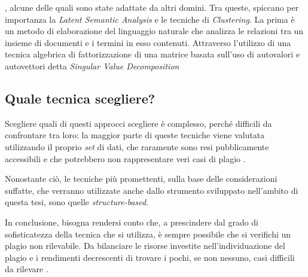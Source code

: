 , alcune delle quali sono state adattate da altri domini.
%
Tra queste, spiccano per importanza la \textit{Latent Semantic Analysis} e le tecniche di \textit{Clustering}.
%
La prima è un metodo di elaborazione del linguaggio naturale che analizza le relazioni tra un insieme di documenti e i termini in esso contenuti.
%
Attraverso l'utilizzo di una tecnica algebrica di fattorizzazione di una matrice basata sull'uso di autovalori e autovettori detta \textit{Singular Value Decomposition} 

\subsection{Quale tecnica scegliere?}
Scegliere quali di questi approcci scegliere è complesso, perché difficili da confrontare tra loro: la maggior parte di queste tecniche viene valutata utilizzando il proprio \textit{set} di dati, che raramente sono resi pubblicamente accessibili e che potrebbero non rappresentare veri casi di plagio \cite{karnalim-budi-toba-joy-2019}.

Nonostante ciò, le tecniche più promettenti, sulla base delle considerazioni suffatte, che verranno utilizzate anche dallo strumento sviluppato nell'ambito di questa tesi, sono quelle \textit{structure-based}. 

In conclusione, bisogna rendersi conto che, a prescindere dal grado di sofisticatezza della tecnica che si utilizza, è sempre possibile che si verifichi un plagio non rilevabile.
%
Da bilanciare le risorse investite nell'individuazione del plagio e i rendimenti decrescenti di trovare i pochi, se non nessuno, casi difficili da rilevare \cite{joy-99}.



